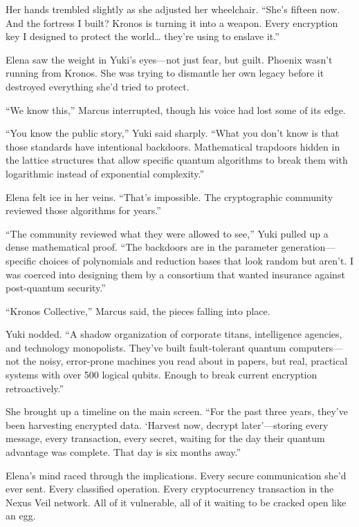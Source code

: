 Her hands trembled slightly as she adjusted her wheelchair. ``She's fifteen now. And the fortress I built? Kronos is turning it into a weapon. Every encryption key I designed to protect the world\ldots{} they're using to enslave it.''

Elena saw the weight in Yuki's eyes---not just fear, but guilt. Phoenix wasn't running from Kronos. She was trying to dismantle her own legacy before it destroyed everything she'd tried to protect.

``We know this,'' Marcus interrupted, though his voice had lost some of its edge.

``You know the public story,'' Yuki said sharply. ``What you don't know is that those standards have intentional backdoors. Mathematical trapdoors hidden in the lattice structures that allow specific quantum algorithms to break them with logarithmic instead of exponential complexity.''

Elena felt ice in her veins. ``That's impossible. The cryptographic community reviewed those algorithms for years.''

``The community reviewed what they were allowed to see,'' Yuki pulled up a dense mathematical proof. ``The backdoors are in the parameter generation---specific choices of polynomials and reduction bases that look random but aren't. I was coerced into designing them by a consortium that wanted insurance against post-quantum security.''

``Kronos Collective,'' Marcus said, the pieces falling into place.

Yuki nodded. ``A shadow organization of corporate titans, intelligence agencies, and technology monopolists. They've built fault-tolerant quantum computers---not the noisy, error-prone machines you read about in papers, but real, practical systems with over 500 logical qubits. Enough to break current encryption retroactively.''

She brought up a timeline on the main screen. ``For the past three years, they've been harvesting encrypted data. `Harvest now, decrypt later'---storing every message, every transaction, every secret, waiting for the day their quantum advantage was complete. That day is six months away.''

Elena's mind raced through the implications. Every secure communication she'd ever sent. Every classified operation. Every cryptocurrency transaction in the Nexus Veil network. All of it vulnerable, all of it waiting to be cracked open like an egg.


